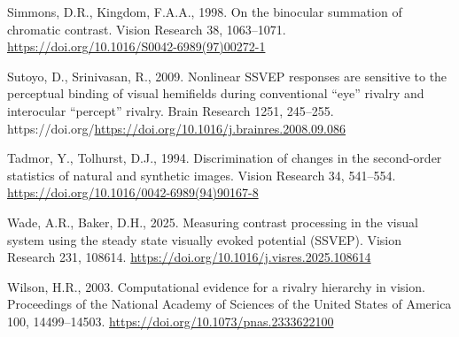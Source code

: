 \documentclass[
  12pt,
]{article}
\newlength{\cslhangindent}
\newenvironment{CSLReferences}[2] %
 {\begin{list}{}{%
  \setlength{\itemindent}{0pt}
  \setlength{\leftmargin}{0pt}
  \setlength{\parsep}{0pt}
  \ifodd #1
   \setlength{\leftmargin}{\cslhangindent}
   \setlength{\itemindent}{-1\cslhangindent}
  \fi
  \setlength{\itemsep}{#2\baselineskip}}}
 {\end{list}}
\begin{document}
\begin{CSLReferences}{1}{0}
Simmons, D.R., Kingdom, F.A.A., 1998. On the binocular summation of
chromatic contrast. Vision Research 38, 1063--1071.
\url{https://doi.org/10.1016/S0042-6989(97)00272-1}

Sutoyo, D., Srinivasan, R., 2009. Nonlinear SSVEP responses are
sensitive to the perceptual binding of visual hemifields during
conventional {``eye''} rivalry and interocular {``percept''} rivalry.
Brain Research 1251, 245--255.
https://doi.org/\url{https://doi.org/10.1016/j.brainres.2008.09.086}

Tadmor, Y., Tolhurst, D.J., 1994. Discrimination of changes in the
second-order statistics of natural and synthetic images. Vision Research
34, 541--554. \url{https://doi.org/10.1016/0042-6989(94)90167-8}

Wade, A.R., Baker, D.H., 2025. Measuring contrast processing in the
visual system using the steady state visually evoked potential (SSVEP).
Vision Research 231, 108614.
\url{https://doi.org/10.1016/j.visres.2025.108614}

Wilson, H.R., 2003. Computational evidence for a rivalry hierarchy in
vision. Proceedings of the National Academy of Sciences of the United
States of America 100, 14499--14503.
\url{https://doi.org/10.1073/pnas.2333622100}

\end{CSLReferences}
\end{document}
